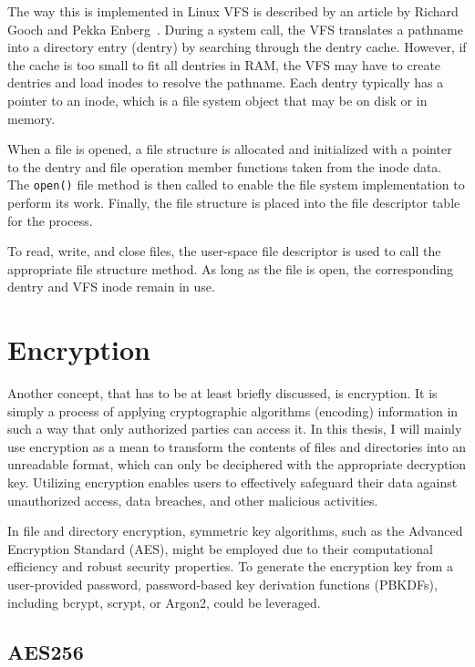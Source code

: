 The way this is implemented in Linux VFS is described by an article by Richard Gooch and Pekka Enberg~\cite{vfs}.
During a system call, the VFS translates a pathname into a directory entry (dentry) by searching through the dentry cache.
However, if the cache is too small to fit all dentries in RAM, the VFS may have to create dentries and load inodes to resolve the pathname.
Each dentry typically has a pointer to an inode, which is a file system object that may be on disk or in memory.

When a file is opened, a file structure is allocated and initialized with a pointer to the dentry and file operation member functions taken from the inode data.
The \texttt{open()} file method is then called to enable the file system implementation to perform its work.
Finally, the file structure is placed into the file descriptor table for the process.

To read, write, and close files, the user-space file descriptor is used to call the appropriate file structure method.
As long as the file is open, the corresponding dentry and VFS inode remain in use.


\section{Encryption}\label{sec:encryption-approaches}

Another concept, that has to be at least briefly discussed, is encryption.
It is simply a process of applying cryptographic algorithms (encoding) information in such a way that only authorized parties can access it.
In this thesis, I will mainly use encryption as a mean to transform the contents of files and directories into an unreadable format, which can only be deciphered with the appropriate decryption key.
Utilizing encryption enables users to effectively safeguard their data against unauthorized access, data breaches, and other malicious activities.

In file and directory encryption, symmetric key algorithms, such as the Advanced Encryption Standard (AES), might be employed due to their computational efficiency and robust security properties.
To generate the encryption key from a user-provided password, password-based key derivation functions (PBKDFs), including bcrypt, scrypt, or Argon2, could be leveraged.

\subsection{AES256}\label{subsec:aes}

